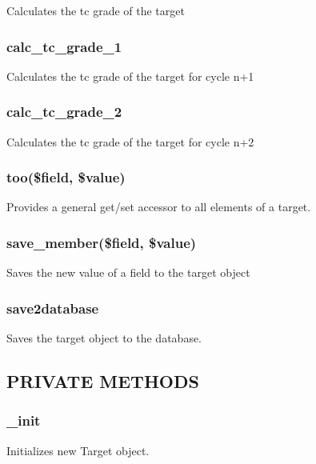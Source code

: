 \documentclass{article}
\begin{document}
Calculates the tc grade of the target

\subsubsection*{calc\_tc\_grade\_1\label{Target_calc_tc_grade_1}}


Calculates the tc grade of the target for cycle n+1

\subsubsection*{calc\_tc\_grade\_2\label{Target_calc_tc_grade_2}}


Calculates the tc grade of the target for cycle n+2

\subsubsection*{too(\$field, \$value)\label{Target_too_field_value_}}


Provides a general get/set accessor to all elements of a target.

\subsubsection*{save\_member(\$field, \$value)\label{Target_save_member_field_value_}}


Saves the new value of a field to the target object

\subsubsection*{save2database\label{Target_save2database}}


Saves the target object to the database.

\subsection*{PRIVATE METHODS\label{Target_PRIVATE_METHODS}}
\subsubsection*{\_init\label{Target__init}}


Initializes new Target object.
\end{document}
